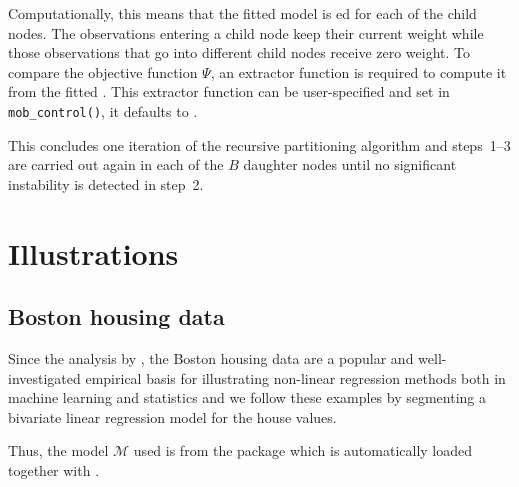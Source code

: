 \documentclass{Z}
\begin{document}
Computationally, this means that the fitted model  is ed
for each of the child nodes. The observations entering a child node keep their
current weight while those observations that go into different child nodes receive
zero weight. To compare the objective function $\Psi$, an extractor function
is required to compute it from the fitted . This extractor function
can be user-specified and set in \verb:mob_control():, it defaults to .


This concludes one iteration of the recursive partitioning algorithm and steps~1--3
are carried out again in each of the $B$ daughter nodes until no significant 
instability is detected in step~2.

\section{Illustrations}
\label{sec:illustration}

\subsection{Boston housing data}

Since the analysis by \cite{BreimanFriedman1985}, the Boston housing data are 
a popular and well-investigated empirical basis for illustrating non-linear 
regression methods both in machine learning and statistics
\citep[see][for two recent examples]{Gama2004,Samarovetal2005} and we follow 
these examples by segmenting a bivariate linear regression model for the house
values.

Thus, the model $\mathcal{M}$ used is  from the 
package which is automatically loaded together with .
\end{document}
